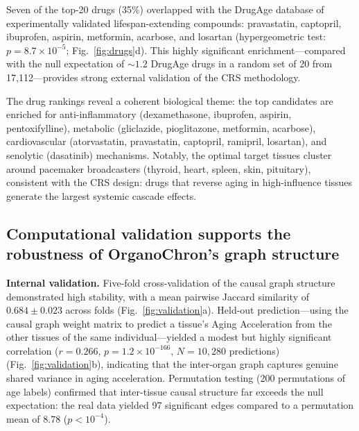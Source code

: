 \documentclass[11pt,a4paper]{article}
\begin{document}
Seven of the top-20 drugs (35\%) overlapped with the DrugAge database of experimentally validated lifespan-extending compounds: pravastatin, captopril, ibuprofen, aspirin, metformin, acarbose, and losartan (hypergeometric test: $p = 8.7 \times 10^{-5}$; Fig.~\ref{fig:drugs}d). This highly significant enrichment---compared with the null expectation of ${\sim}1.2$ DrugAge drugs in a random set of 20 from 17,112---provides strong external validation of the CRS methodology.

The drug rankings reveal a coherent biological theme: the top candidates are enriched for anti-inflammatory (dexamethasone, ibuprofen, aspirin, pentoxifylline), metabolic (gliclazide, pioglitazone, metformin, acarbose), cardiovascular (atorvastatin, pravastatin, captopril, ramipril, losartan), and senolytic (dasatinib) mechanisms. Notably, the optimal target tissues cluster around pacemaker broadcasters (thyroid, heart, spleen, skin, pituitary), consistent with the CRS design: drugs that reverse aging in high-influence tissues generate the largest systemic cascade effects.

\subsection*{Computational validation supports the robustness of OrganoChron's graph structure}

\textbf{Internal validation.} Five-fold cross-validation of the causal graph structure demonstrated high stability, with a mean pairwise Jaccard similarity of $0.684 \pm 0.023$ across folds (Fig.~\ref{fig:validation}a). Held-out prediction---using the causal graph weight matrix to predict a tissue's Aging Acceleration from the other tissues of the same individual---yielded a modest but highly significant correlation ($r = 0.266$, $p = 1.2 \times 10^{-166}$, $N = 10{,}280$ predictions) (Fig.~\ref{fig:validation}b), indicating that the inter-organ graph captures genuine shared variance in aging acceleration. Permutation testing (200 permutations of age labels) confirmed that inter-tissue causal structure far exceeds the null expectation: the real data yielded 97 significant edges compared to a permutation mean of 8.78 ($p < 10^{-4}$).
\end{document}
